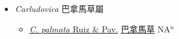 
  \begin{itemize}
 \item[] \textit{Carludovica} 巴拿馬草屬
                    
  \begin{itemize}
        \item[] \href{http://www.theplantlist.org/tpl1.1/search?q=Carludovica+palmata}{\textit{C. palmata} Ruiz \& Pav.}   \href{\detokenize{http://taibnet.sinica.edu.tw/chi/taibnet_species_list.php?T2=巴拿馬草&T2_new_value=true&fr=y}}{巴拿馬草} NA$^n$
  \end{itemize}
  \end{itemize}
